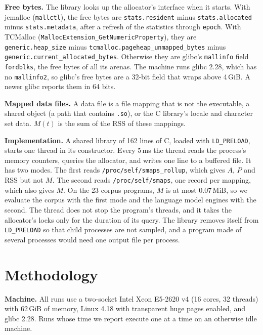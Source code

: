 \documentclass[11pt]{article}
\begin{document}
\begin{sloppypar}
\textbf{Free bytes.} The library looks up the allocator's interface when it starts. With jemalloc (\texttt{mallctl}),
the free bytes are \texttt{stats.resident} minus \texttt{stats.allocated} minus \texttt{stats.metadata}, after a
refresh of the statistics through \texttt{epoch}. With TCMalloc (\texttt{MallocExtension\_GetNumericProperty}), they
are \texttt{generic.heap\_size} minus \texttt{tcmalloc.pageheap\_unmapped\_bytes} minus
\texttt{generic.current\_allocated\_bytes}. Otherwise they are glibc's \texttt{mallinfo} field \texttt{fordblks}, the
free bytes of all its arenas. The machine runs glibc 2.28, which has no \texttt{mallinfo2}, so glibc's free bytes are
a 32-bit field that wraps above 4\,GiB. A newer glibc reports them in 64 bits.
\end{sloppypar}

\textbf{Mapped data files.} A data file is a file mapping that is not the executable, a shared object (a path that
contains \texttt{.so}), or the C library's locale and character set data. $M(t)$ is the sum of the RSS of these
mappings.

\textbf{Implementation.} A shared library of 162 lines of C, loaded with \texttt{LD\_PRELOAD}, starts one thread in
its constructor. Every 5\,ms the thread reads the process's memory counters, queries the allocator, and writes one line
to a buffered file. It has two modes. The first reads \texttt{/proc/self/smaps\_rollup}, which gives $A$, $P$ and RSS
but not $M$. The second reads \texttt{/proc/self/smaps}, one record per mapping, which also gives $M$. On the 23
corpus programs, $M$ is at most 0.07\,MiB, so we evaluate the corpus with the first mode and the language model
engines with the second. The thread does not stop the program's threads, and it takes the allocator's locks only for
the duration of its query. The library removes itself from \texttt{LD\_PRELOAD} so that child processes are not
sampled, and a program made of several processes would need one output file per process.

\section{Methodology}
\label{sec:method}

\textbf{Machine.} All runs use a two-socket Intel Xeon E5-2620 v4 (16 cores, 32 threads) with 62\,GiB of memory,
Linux 4.18 with transparent huge pages enabled, and glibc 2.28. Runs whose time we report execute one at a time on an
otherwise idle machine.
\end{document}

